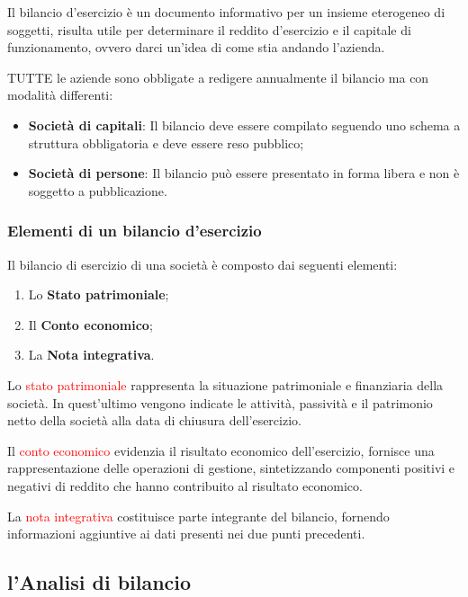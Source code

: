 \documentclass[14pt]{extarticle}
\begin{document}
Il bilancio d'esercizio è un documento informativo per un insieme eterogeneo di
soggetti, risulta utile per determinare il reddito d'esercizio e il capitale di
funzionamento, ovvero darci un'idea di come stia andando l'azienda.

TUTTE le aziende sono obbligate a redigere annualmente il bilancio ma con
modalità differenti:

\begin{itemize}
    \item \textbf{Società di capitali}: Il bilancio deve essere compilato
    seguendo uno schema a struttura obbligatoria e deve essere reso pubblico; 
    \item \textbf{Società di persone}: Il bilancio può essere presentato in
    forma libera e non è soggetto a pubblicazione. 
\end{itemize}

\subsubsection{Elementi di un bilancio d'esercizio}

Il bilancio di esercizio di una società è composto dai seguenti elementi:

\begin{enumerate}
    \item Lo \textbf{Stato patrimoniale};
    \item Il \textbf{Conto economico};
    \item La \textbf{Nota integrativa}.
\end{enumerate}

Lo \textcolor{red}{stato patrimoniale} rappresenta la situazione patrimoniale e
finanziaria della \\
società. In quest'ultimo vengono indicate le attività, passività e il patrimonio
netto della società alla data di chiusura dell'esercizio.

Il \textcolor{red}{conto economico} evidenzia il risultato economico
dell'esercizio, fornisce una rappresentazione delle operazioni di gestione,
sintetizzando componenti positivi e negativi di reddito che hanno contribuito al
risultato economico.

La \textcolor{red}{nota integrativa} costituisce parte integrante del bilancio,
fornendo informazioni aggiuntive ai dati presenti nei due punti precedenti.

\newpage
\subsection{l'Analisi di bilancio}
\end{document}
